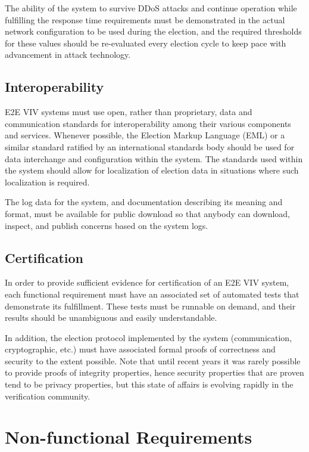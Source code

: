 The ability of the system to survive DDoS attacks and continue
operation while fulfilling the response time requirements must be
demonstrated in the actual network configuration to be used during the
election, and the required thresholds for these values should be
re-evaluated every election cycle to keep pace with advancement in
attack technology.

\subsection{Interoperability}

E2E VIV systems must use open, rather than proprietary, data and
communication standards for interoperability among their various
components and services. Whenever possible, the Election Markup
Language (EML) or a similar standard ratified by an international
standards body should be used for data interchange and configuration
within the system. The standards used within the system should allow
for localization of election data in situations where such
localization is required.

The log data for the system, and documentation describing its meaning
and format, must be available for public download so that anybody can
download, inspect, and publish concerns based on the system logs. 

\subsection{Certification}

In order to provide sufficient evidence for certification of an E2E
VIV system, each functional requirement must have an associated set of
automated tests that demonstrate its fulfillment. These tests must be
runnable on demand, and their results should be unambiguous and easily
understandable.

In addition, the election protocol implemented by the system
(communication, cryptographic, etc.) must have associated formal
proofs of correctness and security to the extent possible. Note that
until recent years it was rarely possible to provide proofs of
integrity properties, hence security properties that are proven
tend to be privacy properties, but this state of affairs is evolving
rapidly in the verification community.

\section{Non-functional Requirements}

